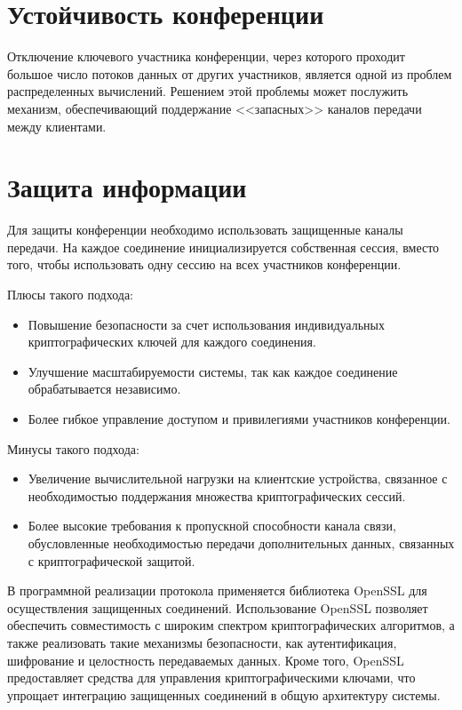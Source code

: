 \section{Устойчивость конференции}

Отключение ключевого участника конференции, через которого проходит большое число потоков данных от других участников, является одной из проблем распределенных вычислений. Решением этой проблемы может послужить механизм, обеспечивающий поддержание <<запасных>> каналов передачи между клиентами.

\section{Защита информации}

Для защиты конференции необходимо использовать защищенные каналы передачи. На каждое соединение инициализируется собственная сессия, вместо того, чтобы использовать одну сессию на всех участников конференции.

Плюсы такого подхода:
\begin{itemize}[label=---]
  \item Повышение безопасности за счет использования индивидуальных криптографических ключей для каждого соединения.
  \item Улучшение масштабируемости системы, так как каждое соединение обрабатывается независимо.
  \item Более гибкое управление доступом и привилегиями участников конференции.
\end{itemize}

Минусы такого подхода:
\begin{itemize}[label=---]
  \item Увеличение вычислительной нагрузки на клиентские устройства, связанное с необходимостью поддержания множества криптографических сессий.
  \item Более высокие требования к пропускной способности канала связи, обусловленные необходимостью передачи дополнительных данных, связанных с криптографической защитой.
\end{itemize}

В программной реализации протокола применяется библиотека OpenSSL \cite{openssl} для осуществления защищенных соединений. Использование OpenSSL позволяет обеспечить совместимость с широким спектром криптографических алгоритмов, а также реализовать такие механизмы безопасности, как аутентификация, шифрование и целостность передаваемых данных. Кроме того, OpenSSL предоставляет средства для управления криптографическими ключами, что упрощает интеграцию защищенных соединений в общую архитектуру системы.

